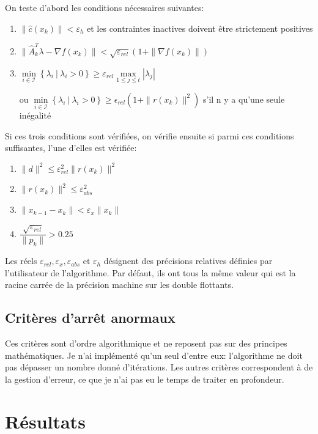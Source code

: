 \documentclass[a4paper,11pt]{article}
\numberwithin{equation}{section}
\begin{document}
On teste d'abord les conditions nécessaires suivantes:
\begin{enumerate}
\item
$\|\hat{c}(x_{k})\| < \varepsilon_{h}$  et les contraintes inactives doivent être strictement positives
\item
$\|\hat{A}_{k}^T\lambda - \nabla f(x_{k})\| < \sqrt{\varepsilon_{rel}}\left(1+\|\nabla f(x_{k})\|\right)$
\item
$\underset{i \in \mathcal{I}}{\min}\left\{ \lambda_i\ |\ \lambda_i > 0 \right\} \geq \varepsilon_{rel} \underset{1\leq j\leq t}{\max} |\lambda_j|$ 

$\text{ou } \underset{i \in \mathcal{I}}{\min}\left\{ \lambda_i\ |\ \lambda_i > 0 \right\} \geq \epsilon_{rel} \left(1+\|r(x_{k})\|^2\right) $ s'il n y a qu'une seule inégalité
\end{enumerate}

Si ces trois conditions sont vérifiées, on vérifie ensuite si parmi ces conditions suffisantes, l'une d'elles est vérifiée: 

\begin{enumerate}
\item
$\|d\|^2 \leq \varepsilon_{rel}^2 \|r(x_{k})\|^2$
\item
$\|r(x_{k})\|^2 \leq \varepsilon_{abs}^2$
\item
$\|x_{k-1} - x_k\| < \varepsilon_{x}\|x_k\|$
\item
$\dfrac{\sqrt{\varepsilon_{rel}}}{\|p_k\|} > 0.25$
\end{enumerate}

Les réels $\varepsilon_{rel},\varepsilon_{x}, \varepsilon_{abs} \text{ et } \varepsilon_{h}$ désignent des précisions relatives définies par l'utilisateur de l'algorithme. Par défaut, ils ont tous la même valeur qui est la racine carrée de la précision machine sur les double flottants.

\subsection{Critères d'arrêt anormaux}

Ces critères sont d'ordre algorithmique et ne reposent pas sur des principes mathématiques. Je n'ai implémenté qu'un seul d'entre eux: l'algorithme ne doit pas dépasser un nombre donné d'itérations. Les autres critères correspondent à de la gestion d'erreur, ce que je n'ai pas eu le temps de traiter en profondeur.


\section{Résultats}
\end{document}
